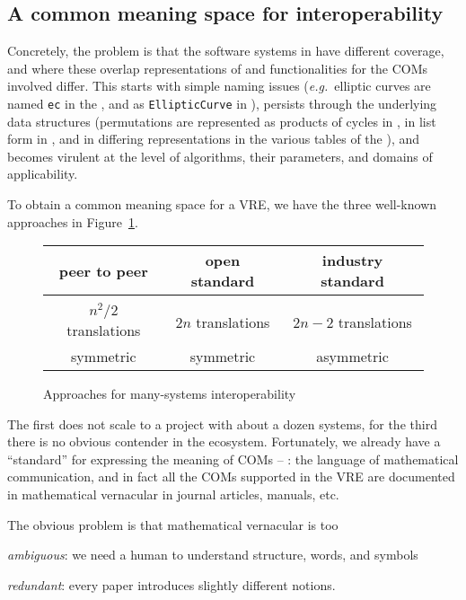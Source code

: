 \subsection{A common meaning space for interoperability}

Concretely, the problem is that the software systems in \ODK have different coverage, and
where these overlap representations of and functionalities for the COMs involved differ.
This starts with simple naming issues (\emph{e.g.}\ elliptic curves are named
\lstinline|ec| in the \LMFDB, and as \lstinline|EllipticCurve| in \Sage), persists through
the underlying data structures (permutations are represented as products of cycles in
\GAP, in list form in \Sage, and in differing representations in the various tables of the
\LMFDB), and becomes virulent at the level of algorithms, their parameters, and domains of
applicability.

To obtain a common meaning space for a VRE, we have the three well-known approaches in
Figure~\ref{fig:interop}.
\begin{figure}[ht]\centering
  \begin{tabular}{|c|c|c|}\hline
    peer to peer & open standard & industry standard\\\hline
     &  & \\\hline
    $n^2/2$  translations & $2n$ translations & $2n-2$ translations \\
    symmetric & symmetric & asymmetric\\\hline
  \end{tabular}
  \caption{Approaches for many-systems interoperability}\label{fig:interop}
\end{figure}

The first does not scale to a project with about a dozen systems, for the third there is
no obvious contender in the \ODK ecosystem. Fortunately, we already have a ``standard'' for
expressing the meaning of COMs -- : the language of
mathematical communication, and in fact all the COMs supported in the \ODK VRE are documented
in mathematical vernacular in journal articles, manuals, etc.

The obvious problem is that mathematical vernacular is too 
\begin{inparaenum}[\em i\rm)]
\item \emph{ambiguous}: we need a human to understand structure, words, and symbols
\item \emph{redundant}: every paper introduces slightly different notions. 
\end{inparaenum}

